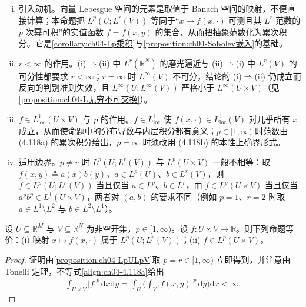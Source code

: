 \documentclass[../../main.tex]{subfiles}%
\begin{document}
\begin{remark}
\begin{enumerate}[(i)]
\item 引入动机。向量 Lebesgue 空间的元素是取值于 Banach 空间的映射，不便直接计算；本命题把 $L^p(U;L^r(V))$ 等同于“$x\mapsto f(x,\cdot)$ 可测且其 $L^r$ 范数的 $p$ 次幂可积”的实值函数 $f=f(x,y)$ 的集合，从而把抽象范数化为累次积分。它是\cref{corollary:ch04-Lp乘积}与\cref{proposition:ch04-Sobolev嵌入}的基础。

\item $r<\infty$ 的作用。(i)$\Rightarrow$(ii) 中 $L^r(\mathbb{R}^N)$ 的磨光逼近与 (ii)$\Rightarrow$(i) 中 $L^r(V)$ 的可分性都要求 $r<\infty$；$r=\infty$ 时 $L^\infty(V)$ 不可分，结论的 (i)$\Rightarrow$(ii) 仍成立而反向的判别准则失效，且 $L^\infty(U;L^\infty(V))$ 严格小于 $L^\infty(U\times V)$（见\cref{proposition:ch04-L无穷不可交换}）。

\item $f\in L^1_{\mathrm{loc}}(U\times V)$ 与 $p$ 的作用。$f\in L^1_{\mathrm{loc}}$ 使 $f(x,\cdot)\in L^1_{\mathrm{loc}}(V)$ 对几乎所有 $x$ 成立，从而使命题中的分布导数与内层积分都有意义；$p\in[1,\infty)$ 时范数由 (4.118a) 的累次积分给出，$p=\infty$ 时须改用 (4.118b) 的本性上确界形式。

\item 适用边界。$p\neq r$ 时 $L^p(U;L^r(V))$ 与 $L^p(U\times V)$ 一般不相等：取 $f(x,y)\triangleq a(x)b(y)$，$a\in L^p(U)$、$b\in L^r(V)$，则 $f\in L^p(U;L^r(V))$ 当且仅当 $a\in L^p$、$b\in L^r$，而 $f\in L^p(U\times V)$ 当且仅当 $a^p b^p\in L^1(U\times V)$，两者对 $(a,b)$ 的要求不同（例如 $p=1$、$r=2$ 时取 $a\in L^1\setminus L^2$ 与 $b\in L^2\setminus L^1$）。
\end{enumerate}
\end{remark}

\begin{corollary}\label{corollary:ch04-Lp乘积}
设 $U\subseteq\mathbb{R}^M$ 与 $V\subseteq\mathbb{R}^N$ 为非空开集，$p\in[1,\infty)$。设 $f:U\times V\to\mathbb{R}$。则下列命题等价：(i) 映射 $x\mapsto f(x,\cdot)$ 属于 $L^p(U;L^p(V))$；(ii) $f\in L^p(U\times V)$。
\end{corollary}

\begin{proof}
证明由\cref{proposition:ch04-LpULpV}取 $p=r\in[1,\infty)$ 立即得到，并注意由 Tonelli 定理，不等式\eqref{align:ch04-4.118a}给出
\begin{align*}
\int_{U\times V}|f|^p\,\mathrm{d}x\mathrm{d}y=\int_U\Big(\int_V|f(x,y)|^p\,\mathrm{d}y\Big)\mathrm{d}x<\infty.
\end{align*}
\end{proof}
\end{document}
